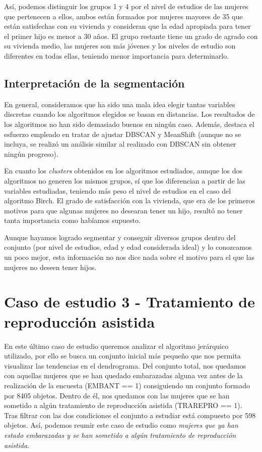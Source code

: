 \documentclass[a4paper, 20pt]{article}
\begin{document}
Así, podemos distinguir los grupos 1 y 4 por el nivel de estudios de las mujeres que pertenecen a ellos, ambos están formados por mujeres mayores de 35 que están satisfechas con su vivienda y consideran que la edad apropiada para tener el primer hijo es menor a 30 años. El grupo restante tiene un grado de agrado con su vivienda medio, las mujeres son más jóvenes y los niveles de estudio son diferentes en todas ellas, teniendo menor importancia para determinarlo.

\subsection{Interpretación de la segmentación}
En general, consideramos que ha sido una mala idea elegir tantas variables discretas cuando los algoritmos elegidos se basan en distancias. Los resultados de los algoritmos no han sido demasiado buenos en ningún caso. Además, destaca el esfuerzo empleado en tratar de ajustar DBSCAN y MeanShift (aunque no se incluya, se realizó un análisis similar al realizado con DBSCAN sin obtener ningún progreso).

En cuanto los \textit{clusters} obtenidos en los algoritmos estudiados, aunque los dos algoritmos no generen los mismos grupos, sí que los diferencian a partir de las variables estudiadas, teniendo más peso el nivel de estudios en el caso del algoritmo Birch. El grado de satisfacción con la vivienda, que era de los primeros motivos para que algunas mujeres no desearan tener un hijo, resultó no tener tanta importancia como habíamos supuesto.

Aunque hayamos logrado segmentar y conseguir diversos grupos dentro del conjunto (por nivel de estudios, edad y edad considerada ideal) y lo conozcamos un poco mejor, esta información no nos dice nada sobre el motivo para el que las mujeres no deseen tener hijos.

\section{Caso de estudio 3 - Tratamiento de reproducción asistida}
\label{sec:caso3}

En este último caso de estudio queremos analizar el algoritmo jerárquico utilizado, por ello se busca un conjunto inicial más pequeño que nos permita visualizar las tendencias en el dendrograma. Del conjunto total, nos quedamos con aquellas mujeres que se han quedado embarazadas alguna vez antes de la realización de la encuesta (EMBANT == 1) consiguiendo un conjunto formado por 8405 objetos. Dentro de él, nos quedamos con las mujeres que se han sometido a algún tratamiento de reproducción asistida (TRAREPRO == 1). Tras filtrar con las dos condiciones el conjunto a estudiar está compuesto por 598 objetos. Así, podemos reumir este caso de estudio como \textit{mujeres que ya han estado embarazadas y se han sometido a algún tratamiento de reproducción asistida}.
\end{document}
